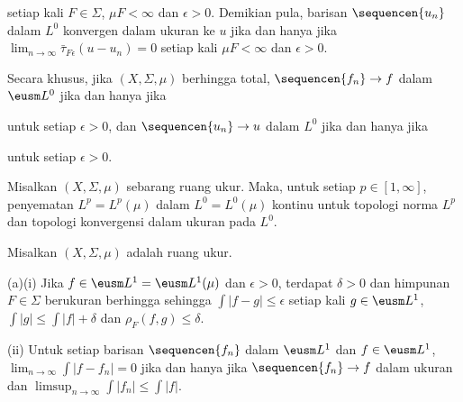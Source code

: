 \noindent setiap kali $F\in\Sigma$, $\mu F<\infty$ dan $\epsilon>0$. Demikian
pula, barisan $\sequencen{u_n}$ dalam $L^0$ konvergen dalam ukuran ke $u$ jika
dan hanya jika
$\lim_{n\to\infty}\bar\tau_{F\epsilon}(u-u_n)=0$ setiap kali $\mu
F<\infty$
dan $\epsilon>0$.

 Secara khusus, jika $(X,\Sigma,\mu)$ berhingga total,
$\sequencen{f_n}\to f$ dalam $\eusm L^0$ jika dan hanya jika


\noindent untuk setiap $\epsilon>0$, dan $\sequencen{u_n}\to u$ dalam $L^0$
jika dan hanya jika


\noindent untuk setiap $\epsilon>0$.

 Misalkan
$(X,\Sigma,\mu)$ sebarang ruang ukur. Maka, untuk setiap $p\in[1,\infty]$,
penyematan $L^p=L^p(\mu)$ dalam $L^0=L^0(\mu)$ kontinu untuk topologi norma
$L^p$ dan topologi konvergensi dalam ukuran pada $L^0$.


 Misalkan $(X,\Sigma,\mu)$ adalah ruang ukur.

(a)(i) Jika $f\in\eusm L^1=\eusm L^1(\mu)$ dan $\epsilon>0$, terdapat
$\delta>0$ dan himpunan $F\in\Sigma$ berukuran berhingga sehingga
$\int|f-g|\le\epsilon$ setiap kali $g\in\eusm L^1$, $\int|g|\le\int|f|+\delta$
dan $\rho_F(f,g)\le\delta$.

\quad(ii) Untuk setiap barisan $\sequencen{f_n}$ dalam $\eusm L^1$ dan $f\in\eusm
L^1$, $\lim_{n\to\infty}\int|f-f_n|=0$ jika dan hanya jika $\sequencen{f_n}\to f$ dalam ukuran
dan $\limsup_{n\to\infty}\int|f_n|\le\int|f|$.

